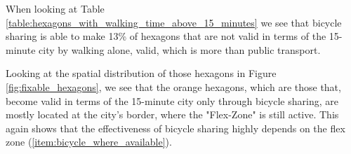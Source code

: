 When looking at Table \ref{table:hexagons_with_walking_time_above_15_minutes} we see that bicycle sharing is able to make 13\% of hexagons that are not valid in terms of the 15-minute city by walking alone, valid, which is more than public transport.

Looking at the spatial distribution of those hexagons in Figure \ref{fig:fixable_hexagons}, we see that the orange hexagons, which are those that, become valid in terms of the 15-minute city only through bicycle sharing, are mostly located at the city's border, where the "Flex-Zone" is still active.
This again shows that the effectiveness of  bicycle sharing highly depends on the flex zone (\ref{item:bicycle_where_available}).






